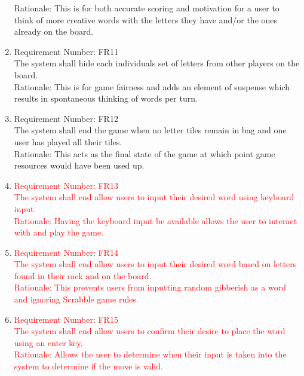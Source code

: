 \documentclass[12pt, titlepage]{article}
\begin{document}
\begin{enumerate}
    Rationale: This is for both accurate scoring and motivation for a user to think of more creative words with the letters they have and/or the ones already on the board.\\
    \item 
    Requirement Number: FR11 \\
    The system shall hide each individuals set of letters from other players on the board.\\
    Rationale: This is for game fairness and adds an element of suspense which results in spontaneous thinking of words per turn.\\
    \item
    Requirement Number: FR12 \\
    The system shall end the game when no letter tiles remain in bag and one user has played all their tiles.\\
    Rationale: This acts as the final state of the game at which point game resources would have been used up.\\
        
    \item
    \textcolor{red}{Requirement Number: FR13} \\
    \textcolor{red}{The system shall end allow users to input their desired word using keyboard input.}\\
    \textcolor{red}{Rationale: Having the keyboard input be available allows the user to interact with and play the game.}\\
    
    \item
    \textcolor{red}{Requirement Number: FR14} \\
    \textcolor{red}{The system shall end allow users to input their desired word based on letters found in their rack and on the board.}\\
    \textcolor{red}{Rationale: This prevents users from inputting random gibberish as a word and ignoring Scrabble game rules.}\\
    
    \item
    \textcolor{red}{Requirement Number: FR15} \\
    \textcolor{red}{The system shall end allow users to confirm their desire to place the word using an enter key.}\\
    \textcolor{red}{Rationale: Allows the user to determine when their input is taken into the system to determine if the move is valid.}\\
    

\end{enumerate}
\end{document}
